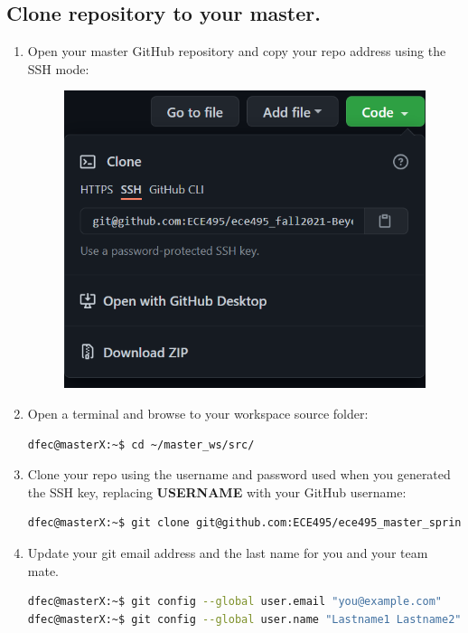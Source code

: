 \documentclass{handout}
\begin{document}
\subsection{Clone repository to your master.}
\begin{enumerate}
\item Open your master GitHub repository and copy your repo address using the SSH mode:
\begin{figure}[H]
	\centering
	\includegraphics[width=.4\textwidth]{clone.png}
\end{figure}
\item Open a terminal and browse to your workspace source folder:
\begin{lstlisting}[language=bash]
dfec@masterX:~$ cd ~/master_ws/src/
\end{lstlisting}
\item Clone your repo using the username and password used when you generated the SSH key, replacing \textbf{USERNAME} with your GitHub username:
\begin{lstlisting}[language=bash]
dfec@masterX:~$ git clone git@github.com:ECE495/ece495_master_spring2022-USERNAME.git
\end{lstlisting}

\item Update your git email address and the last name for you and your team mate.
\begin{lstlisting}[language=bash]
dfec@masterX:~$ git config --global user.email "you@example.com"
dfec@masterX:~$ git config --global user.name "Lastname1 Lastname2"
\end{lstlisting}
\end{enumerate}
\end{document}
